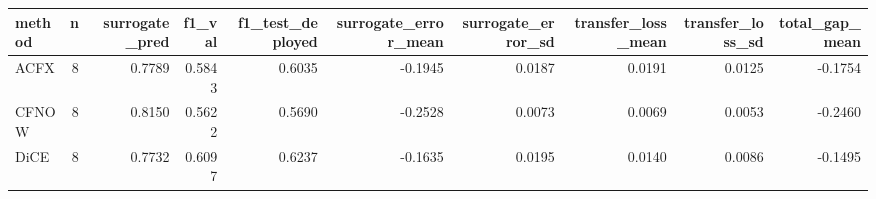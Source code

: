 \begin{tabular}{lrrrrrrrrr}
\toprule
method &  n &  surrogate\_pred &  f1\_val &  f1\_test\_deployed &  surrogate\_error\_mean &  surrogate\_error\_sd &  transfer\_loss\_mean &  transfer\_loss\_sd &  total\_gap\_mean \\
\midrule
  ACFX &  8 &          0.7789 &  0.5843 &            0.6035 &               -0.1945 &              0.0187 &              0.0191 &            0.0125 &         -0.1754 \\
 CFNOW &  8 &          0.8150 &  0.5622 &            0.5690 &               -0.2528 &              0.0073 &              0.0069 &            0.0053 &         -0.2460 \\
  DiCE &  8 &          0.7732 &  0.6097 &            0.6237 &               -0.1635 &              0.0195 &              0.0140 &            0.0086 &         -0.1495 \\
\bottomrule
\end{tabular}
